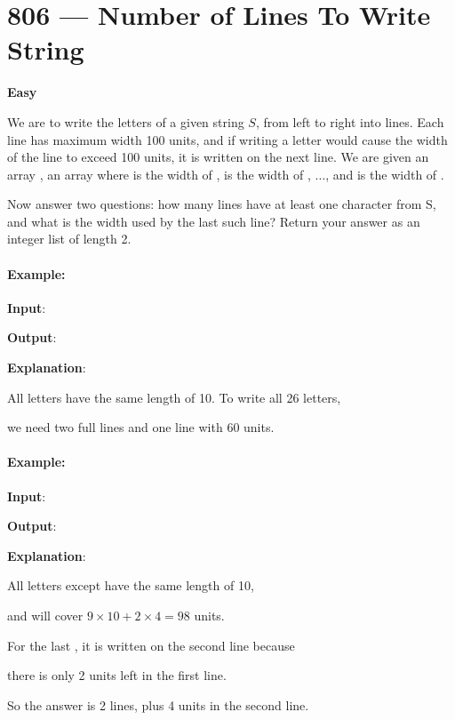 \section{806 --- Number of Lines To Write String}

\textbf{Easy}

We are to write the letters of a given string $S$, from left to right into lines. Each line has maximum width 100 units, and if writing a letter would cause the width of the line to exceed 100 units, it is written on the next line. We are given an array , an array where  is the width of ,  is the width of , $\ldots$, and  is the width of .

Now answer two questions: how many lines have at least one character from S, and what is the width used by the last such line? Return your answer as an integer list of length 2.

 

\paragraph{Example:}

\begin{flushleft}
\textbf{Input}:
 


\textbf{Output}: \fcj{[3, 60]}

\textbf{Explanation}: 

All letters have the same length of 10. To write all 26 letters,

we need two full lines and one line with 60 units.
\end{flushleft}


\paragraph{Example:}

\begin{flushleft}
\textbf{Input}:



\textbf{Output}: \fcj{[2, 4]}

\textbf{Explanation}: 

All letters except  have the same length of 10, 

and  will cover $ 9 \times 10 + 2 \times 4 = 98 $ units.

For the last , it is written on the second line because

there is only 2 units left in the first line.

So the answer is 2 lines, plus 4 units in the second line.
\end{flushleft}
 


